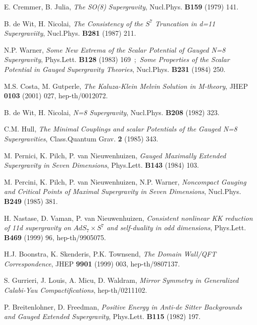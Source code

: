 \documentclass[a4paper,a4paper]{article}
\begin{document}
\begin{thebibliography}{99}
E. Cremmer, B. Julia, 
{\it The SO(8) Supergravity}, 
Nucl.Phys. {\bf B159} (1979) 141. 

B. de Wit, H. Nicolai, 
{\it The Consistency of the $S^7$ Truncation in d=11 Supergraviity}, 
Nucl.Phys. {\bf B281} (1987) 211.

N.P. Warner, 
{\it Some New Extrema of the Scalar Potential of Gauged N=8 Supergravity}, 
Phys.Lett. {\bf B128} (1983) 169\ ;\ 
{\it Some Properties of the Scalar Potential in Gauged Supergravity Theories}, 
Nucl.Phys. {\bf B231} (1984) 250.

M.S. Costa, M. Gutperle, 
{\it The Kaluza-Klein Melvin Solution in M-theory}, 
JHEP {\bf 0103} (2001) 027, hep-th/0012072. 

B. de Wit, H. Nicolai, 
{\it N=8 Supergravity}, 
Nucl.Phys. {\bf B208} (1982) 323. 

C.M. Hull, 
{\it The Minimal Couplings and scalar Potentials of the Gauged N=8 Supergravities}, 
Class.Quantum Grav. {\bf 2} (1985) 343. 

M. Pernici, K. Pilch, P. van Nieuwenhuizen, 
{\it Gauged Maximally Extended Supergravity in Seven Dimensions}, 
Phys.Lett. {\bf B143} (1984) 103. 

M. Percini, K. Pilch, P. van Nieuwenhuizen, N.P. Warner, 
{\it Noncompact Gauging and Critical Points of Maximal Supergravity in Seven Dimensions}, 
Nucl.Phys. {\bf B249} (1985) 381. 

H. Nastase, D. Vaman, P. van Nieuwenhuizen, 
{\it Consistent nonlinear KK reduction of 11d supergravity on $AdS_7\times S^7$ and self-duality in odd 
dimensions}, 
Phys.Lett. {\bf B469} (1999) 96, hep-th/9905075. 

H.J. Boonstra, K. Skenderis, P.K. Townsend, 
{\it The Domain Wall/QFT Correspondence}, 
JHEP {\bf 9901} (1999) 003, hep-th/9807137. 

S. Gurrieri, J. Louis, A. Micu, D. Waldram, 
{\it Mirror Symmetry in Generalized Calabi-Yau Compactifications}, 
hep-th/0211102. 

P. Breitenlohner, D. Freedman, 
{\it Positive Energy in Anti-de Sitter Backgrounds and Gauged Extended Supergravity}, 
Phys.Lett. {\bf B115} (1982) 197. 


\end{thebibliography}
\end{document}
